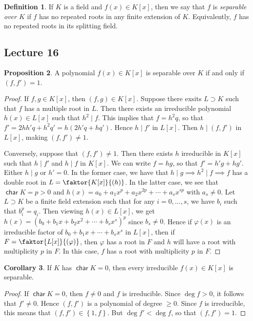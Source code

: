 \documentclass[10pt,letterpaper,cm]{nupset}
\theoremstyle{definition}
\newtheorem{definition}{Definition}[subsection]
\theoremstyle{theorem}
\newtheorem{prop}[definition]{Proposition}
\newtheorem{corollary}[definition]{Corollary}
\theoremstyle{remark}
\newcommand{\1}{\mathbf{1}}
\newcommand{\0}{\vec 0}
\DeclareMathOperator{\Char}{\mathsf{char}}
\begin{document}
\begin{definition}
If $K$ is a field and $f(x) \in K[x]$, then we say that $f$ is \textit{separable over $K$} if $f$ has no repeated roots in any finite extension of $K$. Equivalently, $f$ has no repeated roots in its splitting field.
\end{definition}

\subsection{Lecture 16}

\begin{prop}
A polynomial $f(x) \in K[x]$ is separable over $K$ if and only if $\left(f, f'\right) =1$.
\end{prop}
\begin{proof}
If $f,g \in K[x]$, then $\left(f,g\right) \in K[x]$. Suppose there exsits $L \supset K$ such that $f$ has a multiple root in $L$. Then there exists an irreducible polynomial $h(x) \in L[x]$ such that $h^2 \mid f$. This implies that $f = h^2q$, so that $f' = 2hh'q +h^2q' = h(2h'q+hq')$. Hence $h \mid f'$ in $L[x]$. Then $h \mid \left(f,f'\right)$ in $L[x]$, making $\left(f,f'\right) \ne 1$.

\medskip

 
Conversely, suppose that $\left(f,f'\right) \ne 1$. Then there exists $h$ irreducible in $K[x]$ such that $h\mid f'$ and $h \mid f$ in $K[x]$. We can write $f=hg$, so that $f' = h'g + hg'$. Either $h \mid g$ or $h'=0$. In the former case, we have that $h \mid g \implies h^2 \mid f \implies f$ has a double root in $L = \faktor{K[x]}{(h)}$. In the latter case, we see that $\Char{K} = p>0$ and $h(x) = a_0 + a_1x^p + a_2x^{2p} + \cdots + a_sx^{sp}$ with $a_s \ne 0$. Let $L \supset K$ be a finite field extension such that for any $i=0, \ldots, s$, we have $b_i$ such that $b_i^p = q_i$. Then viewing $h(x) \in L[x]$, we get $h(x) = \left(b_0 + b_1x + b_2x^2 + \cdots + b_sx^s\right)^p$ since $b_s \ne 0$. Hence if $\varphi(x)$ is an irreducible factor of $b_0 + b_1x + \cdots + b_sx^s$ in $L[x]$, then if $F = \faktor{L[x]}{(\varphi)}$, then $\varphi$ has a root in $F$ and $h$ will have a root with multiplicity $p$ in $F$. In this case, $f$ has a root with multiplicity $p$ in $F$.
\end{proof}

\begin{corollary}
If $K$ has $\Char{K} =0$, then every irreducible $f(x) \in K[x]$ is separable. 
\end{corollary}
\begin{proof}
If $\Char{K}=0$, then $f \ne 0$ and $f$ is irreducible. Since $\deg{f} >0$, it follows that $f' \ne 0$. Hence $\left(f,f'\right)$ is a polynomial of degree $\geq 0$. Since $f$ is irreducible, this means that $\left(f,f'\right) \in \left\{1, f\right\}$. But $\deg{f'} < \deg{f}$, so that $\left(f,f'\right) =1$.
\end{proof}
\end{document}
